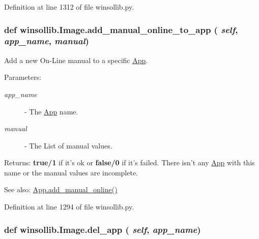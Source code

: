 Definition at line 1312 of file winsollib.py.\hypertarget{classwinsollib_1_1Image_d0ca5577484af8a757812ac1f3087d79}{
\subsubsection[add\_\-manual\_\-online\_\-to\_\-app]{\setlength{\rightskip}{0pt plus 5cm}def winsollib.Image.add\_\-manual\_\-online\_\-to\_\-app ( {\em self},  {\em app\_\-name},  {\em manual})}}
\label{classwinsollib_1_1Image_d0ca5577484af8a757812ac1f3087d79}


Add a new On-Line manual to a specific \hyperlink{classwinsollib_1_1App}{App}. 

\begin{Desc}
\item[Parameters:]
\begin{description}
\item[{\em app\_\-name}]- The \hyperlink{classwinsollib_1_1App}{App} name. \item[{\em manual}]- The List of manual values. \end{description}
\end{Desc}
\begin{Desc}
\item[Returns:]{\bf true/1} if it's ok or {\bf false/0} if it's failed. There isn't any \hyperlink{classwinsollib_1_1App}{App} with this name or the manual values are incomplete.\end{Desc}
\begin{Desc}
\item[See also:]\hyperlink{classwinsollib_1_1App_7d4de96b97f8eac2ceab3ec79443441b}{App.add\_\-manual\_\-online()} \end{Desc}


Definition at line 1294 of file winsollib.py.\hypertarget{classwinsollib_1_1Image_c4f162dc12906d2b7bd3d7966bc894dd}{
\subsubsection[del\_\-app]{\setlength{\rightskip}{0pt plus 5cm}def winsollib.Image.del\_\-app ( {\em self},  {\em app\_\-name})}}
\label{classwinsollib_1_1Image_c4f162dc12906d2b7bd3d7966bc894dd}


